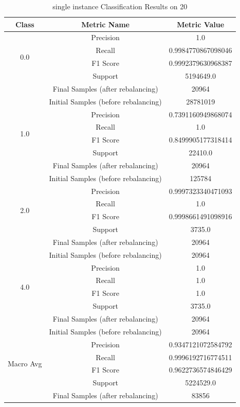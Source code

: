 \begin{longtable}{|c|c|c|}
\caption{single instance Classification Results on 20} \label{tab:20_single_instance_classifiers_results} \\
\hline
Class & Metric Name & Metric Value \\
\hline
\multirow{4}{*}{0.0} & Precision & 1.0 \\
 & Recall & 0.9984770867098046 \\
 & F1 Score & 0.9992379630968387 \\
 & Support & 5194649.0 \\
 & Final Samples (after rebalancing) & 20964 \\
 & Initial Samples (before rebalancing) & 28781019 \\
\hline
\multirow{4}{*}{1.0} & Precision & 0.7391160949868074 \\
 & Recall & 1.0 \\
 & F1 Score & 0.8499905177318414 \\
 & Support & 22410.0 \\
 & Final Samples (after rebalancing) & 20964 \\
 & Initial Samples (before rebalancing) & 125784 \\
\hline
\multirow{4}{*}{2.0} & Precision & 0.9997323340471093 \\
 & Recall & 1.0 \\
 & F1 Score & 0.9998661491098916 \\
 & Support & 3735.0 \\
 & Final Samples (after rebalancing) & 20964 \\
 & Initial Samples (before rebalancing) & 20964 \\
\hline
\multirow{4}{*}{4.0} & Precision & 1.0 \\
 & Recall & 1.0 \\
 & F1 Score & 1.0 \\
 & Support & 3735.0 \\
 & Final Samples (after rebalancing) & 20964 \\
 & Initial Samples (before rebalancing) & 20964 \\
\hline
\multirow{4}{*}{Macro Avg} & Precision & 0.9347121072584792 \\
 & Recall & 0.9996192716774511 \\
 & F1 Score & 0.9622736574846429 \\
 & Support & 5224529.0 \\
 & Final Samples (after rebalancing) & 83856 \\

\end{longtable}
